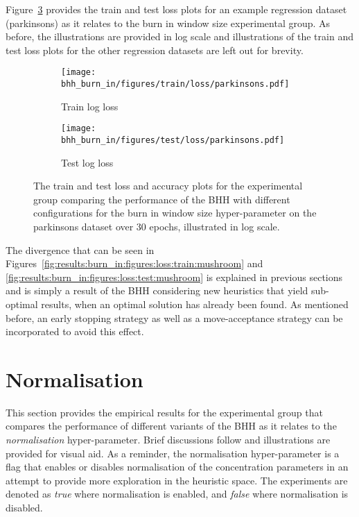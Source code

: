 Figure~\ref{fig:results:burn_in:figures:parkinsons} provides the train and test loss plots for an example regression dataset (parkinsons) as it relates to the burn in window size experimental group. As before, the illustrations are provided in log scale and illustrations of the train and test loss plots for the other regression datasets are left out for brevity.

\begin{figure}[htbp]
      \begin{subfigure}{0.5\textwidth}
            \centering
            \texttt{[image: bhh\_burn\_in/figures/train/loss/parkinsons.pdf]}
            \caption{Train log loss}
            \label{fig:results:burn_in:figures:loss:train:parkinsons}
      \end{subfigure}
      \begin{subfigure}{0.5\textwidth}
            \centering
            \texttt{[image: bhh\_burn\_in/figures/test/loss/parkinsons.pdf]}
            \caption{Test log loss}
            \label{fig:results:burn_in:figures:loss:test:parkinsons}
      \end{subfigure}
      \par\bigskip
      \caption{The train and test loss and accuracy plots for the experimental group comparing the performance of the \acs{BHH} with different configurations for the burn in window size hyper-parameter on the parkinsons dataset over 30 epochs, illustrated in log scale.}
      \label{fig:results:burn_in:figures:parkinsons}
\end{figure}

The divergence that can be seen in Figures~\ref{fig:results:burn_in:figures:loss:train:mushroom} and \ref{fig:results:burn_in:figures:loss:test:mushroom} is explained in previous sections and is simply a result of the \acs{BHH} considering new heuristics that yield sub-optimal results, when an optimal solution has already been found. As mentioned before, an early stopping strategy as well as a move-acceptance strategy can be incorporated to avoid this effect.


\section{Normalisation}\label{sec:results:normalise}

This section provides the empirical results for the experimental group that compares the performance of different variants of the \acs{BHH} as it relates to the \textit{normalisation} hyper-parameter. Brief discussions follow and illustrations are provided for visual aid. As a reminder, the normalisation hyper-parameter is a flag that enables or disables normalisation of the concentration parameters in an attempt to provide more exploration in the heuristic space. The experiments are denoted as \textit{true} where normalisation is enabled, and \textit{false} where normalisation is disabled.

